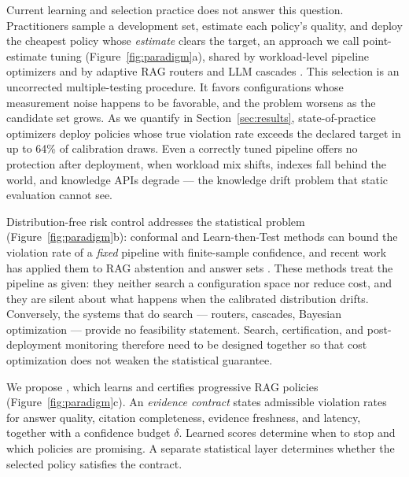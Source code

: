 Current learning and selection practice does not answer this question.
Practitioners sample a development set, estimate each policy's quality,
and deploy the cheapest policy whose \emph{estimate} clears the target,
an approach we call point-estimate tuning
(Figure~\ref{fig:paradigm}a), shared
by workload-level pipeline optimizers \citep{russo2025abacus,
liu2025palimpzest,patel2024lotus} and by adaptive RAG routers and LLM
cascades \citep{jeong2024adaptiverag,chen2023frugalgpt,ong2024routellm}.
This selection is an uncorrected multiple-testing procedure. It favors
configurations whose measurement noise happens to be favorable, and the
problem worsens as the candidate set grows. As we quantify in
Section~\ref{sec:results}, state-of-practice optimizers deploy policies
whose true violation rate exceeds the declared target in up to 64\% of
calibration draws. Even a correctly tuned pipeline offers no protection after deployment,
when workload mix shifts, indexes fall behind the world, and knowledge
APIs degrade --- the knowledge drift problem that static evaluation
cannot see.

Distribution-free risk control addresses the statistical problem
(Figure~\ref{fig:paradigm}b): conformal
and Learn-then-Test methods \citep{angelopoulos2021ltt,
angelopoulos2024crc} can bound the violation rate of a \emph{fixed}
pipeline with finite-sample confidence, and recent work has applied
them to RAG abstention and answer sets \citep{li2024traq,kang2024crag}.
These methods treat the pipeline as given: they neither search a
configuration space nor reduce cost, and they are silent about what
happens when the calibrated distribution drifts. Conversely, the
systems that do search --- routers, cascades, Bayesian optimization ---
provide no feasibility statement. Search, certification, and
post-deployment monitoring therefore need to be designed together so
that cost optimization does not weaken the statistical guarantee.

We propose \system, which learns and certifies progressive RAG policies
(Figure~\ref{fig:paradigm}c). An \emph{evidence contract} states
admissible violation rates for answer quality, citation completeness,
evidence freshness, and latency, together with a confidence budget
$\delta$. Learned scores determine when to stop and which policies are
promising. A separate statistical layer determines whether the
selected policy satisfies the contract.

